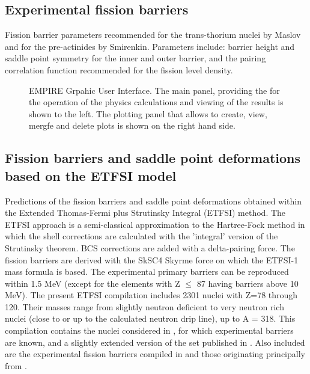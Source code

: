\subsection{Experimental fission barriers}

Fission barrier parameters recommended for the trans-thorium nuclei by
Maslov and for the pre-actinides by Smirenkin. Parameters include: barrier
height and saddle point symmetry for the inner and outer barrier, and the
pairing correlation function recommended for the fission level density.

\begin{figure*}[htbp]
 
\caption{EMPIRE Grpahic User Interface. The main panel, providing the for
the operation of the physics calculations and viewing of the results is
shown to the left. The plotting panel that allows to create, view, mergfe
and delete plots is shown on the right hand side.}
\label{fig:GUI}
\end{figure*}

\subsection{Fission barriers and saddle point deformations based on the
ETFSI model}

Predictions of the fission barriers and saddle point deformations obtained
within the Extended Thomas-Fermi plus Strutinsky Integral (ETFSI) method.
The ETFSI approach is a semi-classical approximation to the Hartree-Fock
method in which the shell corrections are calculated with the 'integral'
version of the Strutinsky theorem. BCS corrections are added with a
delta-pairing force. The fission barriers are derived with the SkSC4 Skyrme
force on which the ETFSI-1 mass formula is based. The experimental primary
barriers can be reproduced within 1.5 MeV (except for the elements with Z $%
\le$ 87 having barriers above 10 MeV). The present ETFSI compilation
includes 2301 nuclei with Z=78 through 120. Their masses range from slightly
neutron deficient to very neutron rich nuclei (close to or up to the
calculated neutron drip line), up to A = 318. This compilation contains the
nuclei considered in \cite{Mamdouh1998}, for which experimental barriers are
known, and a slightly extended version of the set published in \cite%
{Mamdouh(2001)}. Also included are the experimental fission barriers
compiled in \cite{Mamdouh1998} and those originating principally from \cite%
{Smirenkin1993}.


